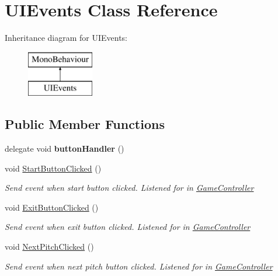 \hypertarget{class_u_i_events}{}\section{U\+I\+Events Class Reference}
\label{class_u_i_events}
Inheritance diagram for U\+I\+Events\+:\begin{figure}[H]
\begin{center}
\leavevmode
\includegraphics[height=2.000000cm]{class_u_i_events}
\end{center}
\end{figure}
\subsection*{Public Member Functions}
\begin{DoxyCompactItemize}
\item 
delegate void {\bfseries button\+Handler} ()\hypertarget{class_u_i_events_ab297f62bccd2409aa695de14979daf0f}{}\label{class_u_i_events_ab297f62bccd2409aa695de14979daf0f}

\item 
void \hyperlink{class_u_i_events_a557558561442fe826285077e38c95c24}{Start\+Button\+Clicked} ()
\begin{DoxyCompactList}\small\item\em Send event when start button clicked. Listened for in \hyperlink{class_game_controller}{Game\+Controller} \end{DoxyCompactList}\item 
void \hyperlink{class_u_i_events_a0338efe693cac9a52735052eb08542c2}{Exit\+Button\+Clicked} ()
\begin{DoxyCompactList}\small\item\em Send event when exit button clicked. Listened for in \hyperlink{class_game_controller}{Game\+Controller} \end{DoxyCompactList}\item 
void \hyperlink{class_u_i_events_a0f353ad5a99c77a80322945fe4c8e2eb}{Next\+Pitch\+Clicked} ()
\begin{DoxyCompactList}\small\item\em Send event when next pitch button clicked. Listened for in \hyperlink{class_game_controller}{Game\+Controller} \end{DoxyCompactList}\end{DoxyCompactItemize}
